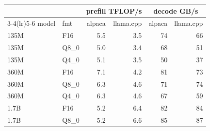 \begin{tabular}{llrrrr}\toprule
 & & \multicolumn{2}{c}{prefill TFLOP/s} & \multicolumn{2}{c}{decode GB/s}\\
\cmidrule(lr){3-4}\cmidrule(lr){5-6}
model & fmt & alpaca & llama.cpp & alpaca & llama.cpp\\\midrule
135M & F16 & 5.5 & 3.5 & 74 & 66\\
135M & Q8\_0 & 5.0 & 3.4 & 68 & 51\\
135M & Q4\_0 & 5.1 & 3.5 & 50 & 37\\
360M & F16 & 7.1 & 4.2 & 81 & 73\\
360M & Q8\_0 & 6.3 & 4.6 & 71 & 74\\
360M & Q4\_0 & 6.3 & 4.6 & 67 & 59\\
1.7B & F16 & 5.2 & 6.4 & 82 & 84\\
1.7B & Q8\_0 & 5.2 & 6.6 & 85 & 87\\
\bottomrule\end{tabular}